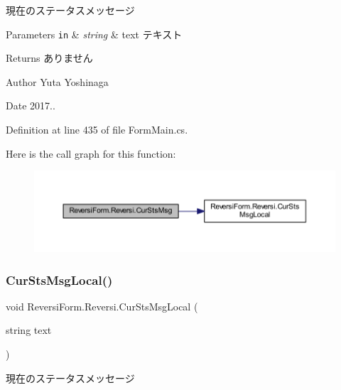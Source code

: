 現在のステータスメッセージ 


\begin{DoxyParams}[1]{Parameters}
\mbox{\tt in}  & {\em string} & text テキスト \\
\hline
\end{DoxyParams}
\begin{DoxyReturn}{Returns}
ありません 
\end{DoxyReturn}
\begin{DoxyAuthor}{Author}
Yuta Yoshinaga 
\end{DoxyAuthor}
\begin{DoxyDate}{Date}
2017.. 
\end{DoxyDate}


Definition at line 435 of file Form\+Main.\+cs.

Here is the call graph for this function\+:
\nopagebreak
\begin{figure}[H]
\begin{center}
\leavevmode
\includegraphics[width=350pt]{class_reversi_form_1_1_reversi_af5009aa7b1b255b9dec7028d8a7c53f7_cgraph}
\end{center}
\end{figure}
\mbox{\label{class_reversi_form_1_1_reversi_a934897d68f7709c32b6fd126351c5f05}} 
\subsubsection{\texorpdfstring{Cur\+Sts\+Msg\+Local()}{CurStsMsgLocal()}}
{\footnotesize\ttfamily void Reversi\+Form.\+Reversi.\+Cur\+Sts\+Msg\+Local (\begin{DoxyParamCaption}\item[{string}]{text }\end{DoxyParamCaption})}



現在のステータスメッセージ 



